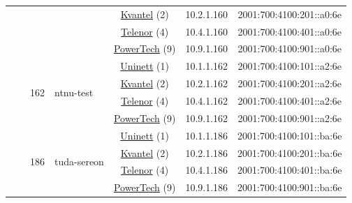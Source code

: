 \begin{small}
\begin{center}
\begin{longtable}{|c|c|c|c|c|c|c|c|}
  &  &  &  & \multicolumn{2}{|c|}{\tiny{\href{http://kvantel.no}{Kvantel} (2)}} & \tiny{10.2.1.160} & \tiny{2001:700:4100:201::a0:6e} \\* \cline{5-5}\cline{6-6}\cline{7-7}\cline{8-8}
  &  &  &  & \multicolumn{2}{|c|}{\tiny{\href{https://www.telenor.no}{Telenor} (4)}} & \tiny{10.4.1.160} & \tiny{2001:700:4100:401::a0:6e} \\* \cline{5-5}\cline{6-6}\cline{7-7}\cline{8-8}
  &  &  &  & \multicolumn{2}{|c|}{\tiny{\href{http://www.powertech.no}{PowerTech} (9)}} & \tiny{10.9.1.160} & \tiny{2001:700:4100:901::a0:6e} \\* \cline{3-3}\cline{4-4}\cline{5-5}\cline{6-6}\cline{7-7}\cline{8-8}
  &  & \multirow{4}{*}{\tiny{162}} & \multicolumn{1}{|l|}{\multirow{4}{*}{\tiny{ntnu-test}}} & \multicolumn{2}{|c|}{\tiny{\href{https://www.uninett.no}{Uninett} (1)}} & \tiny{10.1.1.162} & \tiny{2001:700:4100:101::a2:6e} \\* \cline{5-5}\cline{6-6}\cline{7-7}\cline{8-8}
  &  &  &  & \multicolumn{2}{|c|}{\tiny{\href{http://kvantel.no}{Kvantel} (2)}} & \tiny{10.2.1.162} & \tiny{2001:700:4100:201::a2:6e} \\* \cline{5-5}\cline{6-6}\cline{7-7}\cline{8-8}
  &  &  &  & \multicolumn{2}{|c|}{\tiny{\href{https://www.telenor.no}{Telenor} (4)}} & \tiny{10.4.1.162} & \tiny{2001:700:4100:401::a2:6e} \\* \cline{5-5}\cline{6-6}\cline{7-7}\cline{8-8}
  &  &  &  & \multicolumn{2}{|c|}{\tiny{\href{http://www.powertech.no}{PowerTech} (9)}} & \tiny{10.9.1.162} & \tiny{2001:700:4100:901::a2:6e} \\* \cline{3-3}\cline{4-4}\cline{5-5}\cline{6-6}\cline{7-7}\cline{8-8}
  &  & \multirow{4}{*}{\tiny{186}} & \multicolumn{1}{|l|}{\multirow{4}{*}{\tiny{tuda-sereon}}} & \multicolumn{2}{|c|}{\tiny{\href{https://www.uninett.no}{Uninett} (1)}} & \tiny{10.1.1.186} & \tiny{2001:700:4100:101::ba:6e} \\* \cline{5-5}\cline{6-6}\cline{7-7}\cline{8-8}
  &  &  &  & \multicolumn{2}{|c|}{\tiny{\href{http://kvantel.no}{Kvantel} (2)}} & \tiny{10.2.1.186} & \tiny{2001:700:4100:201::ba:6e} \\* \cline{5-5}\cline{6-6}\cline{7-7}\cline{8-8}
  &  &  &  & \multicolumn{2}{|c|}{\tiny{\href{https://www.telenor.no}{Telenor} (4)}} & \tiny{10.4.1.186} & \tiny{2001:700:4100:401::ba:6e} \\* \cline{5-5}\cline{6-6}\cline{7-7}\cline{8-8}
  &  &  &  & \multicolumn{2}{|c|}{\tiny{\href{http://www.powertech.no}{PowerTech} (9)}} & \tiny{10.9.1.186} & \tiny{2001:700:4100:901::ba:6e} \\* \cline{3-3}\cline{4-4}\cline{5-5}\cline{6-6}\cline{7-7}\cline{8-8}

\end{longtable}
\end{center}
\end{small}
